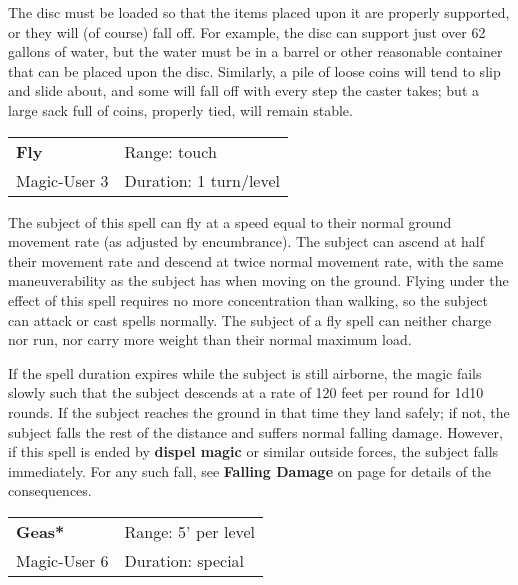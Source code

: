 \documentclass[a4paper,twoside,openany,10pt]{book}
\begin{document}
\begin{multicols}{2}
The disc must be loaded so that the items placed upon it are properly supported, or they will (of course) fall off. For example, the disc can support just over 62 gallons of water, but the water must be in a barrel or other reasonable container that can be placed upon the disc. Similarly, a pile of loose coins will tend to slip and slide about, and some will fall off with every step the caster takes; but a large sack full of coins, properly tied, will remain stable.


\smallskip\begin{flushleft} 
	\begin{tabularx}{0.45\textwidth}{@{}m{3.5cm}m{5.5cm}@{}} 
		\textbf{Fly} & Range: touch\\
		Magic-User 3 &Duration:  1 turn/level\\
	\end{tabularx}\end{flushleft}

The subject of this spell can fly at a speed equal to their normal ground movement rate (as adjusted by encumbrance). The subject can ascend at half their movement rate and descend at twice normal movement rate, with the same maneuverability as the subject has when moving on the ground. Flying under the effect of this spell requires no more concentration than walking, so the subject can attack or cast spells normally. The subject of a fly spell can neither charge nor run, nor carry more weight than their normal maximum load.

If the spell duration expires while the subject is still airborne, the magic fails slowly such that the subject descends at a rate of 120 feet per round for 1d10 rounds. If the subject reaches the ground in that time they land safely; if not, the subject falls the rest of the distance and suffers normal falling damage. However, if this spell is ended by \textbf{dispel magic} or similar outside forces, the subject falls immediately. For any such fall, see \textbf{Falling Damage }on page \hyperlink{falling-damage}{\pageref{falling-damage}} for details of the consequences.

\smallskip\begin{flushleft} 
	\begin{tabularx}{0.45\textwidth}{@{}m{3.5cm}m{5.5cm}@{}} 
		\textbf{Geas*} & Range: 5' per level\\
		Magic-User 6 &Duration:  special\\
	\end{tabularx}\end{flushleft}


\end{multicols}
\end{document}
